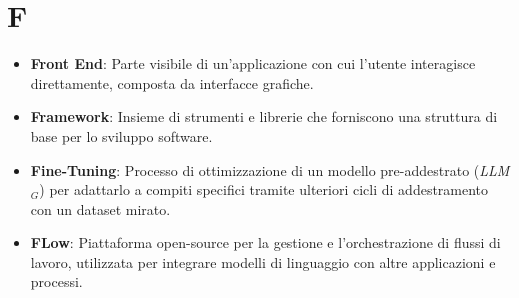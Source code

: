 \section{F}
\begin{itemize}
    \item \textbf{Front End}: Parte visibile di un'applicazione con cui l'utente interagisce direttamente, composta da interfacce grafiche.
    \item \textbf{Framework}: Insieme di strumenti e librerie che forniscono una struttura di base per lo sviluppo software.
    \item \textbf{Fine-Tuning}: Processo di ottimizzazione di un modello pre-addestrato (\textit{LLM}$_G$) per adattarlo a compiti specifici tramite ulteriori cicli di addestramento con un dataset mirato.
    \item \textbf{FLow}: Piattaforma open-source per la gestione e l'orchestrazione di flussi di lavoro, utilizzata per integrare modelli di linguaggio con altre applicazioni e processi.
\end{itemize}
